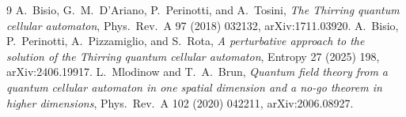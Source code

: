 \documentclass[11pt]{article}
\begin{document}
\begin{thebibliography}{9}
A.~Bisio, G.~M.~D'Ariano, P.~Perinotti, and A.~Tosini,
\emph{The Thirring quantum cellular automaton},
Phys.\ Rev.\ A 97 (2018) 032132, arXiv:1711.03920.
A.~Bisio, P.~Perinotti, A.~Pizzamiglio, and S.~Rota,
\emph{A perturbative approach to the solution of the Thirring quantum
cellular automaton}, Entropy 27 (2025) 198, arXiv:2406.19917.
L.~Mlodinow and T.~A.~Brun,
\emph{Quantum field theory from a quantum cellular automaton in one
spatial dimension and a no-go theorem in higher dimensions},
Phys.\ Rev.\ A 102 (2020) 042211, arXiv:2006.08927.
\end{thebibliography}
\end{document}
